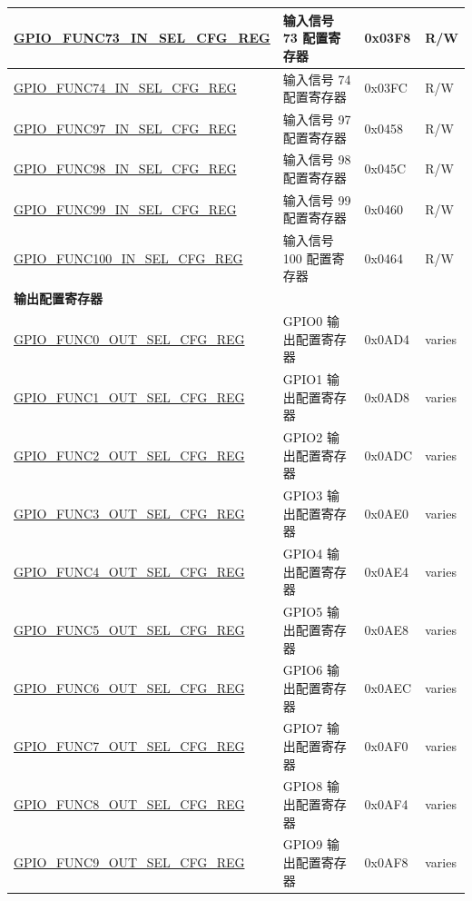\begin{longtable}{ | p{6cm} | p{7.2cm} | p{1.3cm} | p{1cm} | }
\hyperref[regdesc:GPIOFUNCTINSELCFGREG]{GPIO\_FUNC73\_IN\_SEL\_CFG\_REG} & 输入信号 73 配置寄存器 & 0x03F8 & R/W \\ \hline
\hyperref[regdesc:GPIOFUNCTINSELCFGREG]{GPIO\_FUNC74\_IN\_SEL\_CFG\_REG} & 输入信号 74 配置寄存器 & 0x03FC & R/W \\ \hline
\hyperref[regdesc:GPIOFUNCUINSELCFGREG]{GPIO\_FUNC97\_IN\_SEL\_CFG\_REG} & 输入信号 97 配置寄存器 & 0x0458 & R/W \\ \hline
\hyperref[regdesc:GPIOFUNCUINSELCFGREG]{GPIO\_FUNC98\_IN\_SEL\_CFG\_REG} & 输入信号 98 配置寄存器 & 0x045C & R/W \\ \hline
\hyperref[regdesc:GPIOFUNCUINSELCFGREG]{GPIO\_FUNC99\_IN\_SEL\_CFG\_REG} & 输入信号 99 配置寄存器 & 0x0460 & R/W \\ \hline
\hyperref[regdesc:GPIOFUNCUINSELCFGREG]{GPIO\_FUNC100\_IN\_SEL\_CFG\_REG} & 输入信号 100 配置寄存器 & 0x0464 & R/W \\ \hline
\multicolumn{4}{|l|}{\textbf{输出配置寄存器}} \\ \hline
\hyperref[regdesc:GPIOFUNCNOUTSELCFGREG]{GPIO\_FUNC0\_OUT\_SEL\_CFG\_REG} & GPIO0 输出配置寄存器 & 0x0AD4 & varies \\ \hline
\hyperref[regdesc:GPIOFUNCNOUTSELCFGREG]{GPIO\_FUNC1\_OUT\_SEL\_CFG\_REG} & GPIO1 输出配置寄存器 & 0x0AD8 & varies \\ \hline
\hyperref[regdesc:GPIOFUNCNOUTSELCFGREG]{GPIO\_FUNC2\_OUT\_SEL\_CFG\_REG} & GPIO2 输出配置寄存器 & 0x0ADC & varies \\ \hline
\hyperref[regdesc:GPIOFUNCNOUTSELCFGREG]{GPIO\_FUNC3\_OUT\_SEL\_CFG\_REG} & GPIO3 输出配置寄存器 & 0x0AE0 & varies \\ \hline
\hyperref[regdesc:GPIOFUNCNOUTSELCFGREG]{GPIO\_FUNC4\_OUT\_SEL\_CFG\_REG} & GPIO4 输出配置寄存器 & 0x0AE4 & varies \\ \hline
\hyperref[regdesc:GPIOFUNCNOUTSELCFGREG]{GPIO\_FUNC5\_OUT\_SEL\_CFG\_REG} & GPIO5 输出配置寄存器 & 0x0AE8 & varies \\ \hline
\hyperref[regdesc:GPIOFUNCNOUTSELCFGREG]{GPIO\_FUNC6\_OUT\_SEL\_CFG\_REG} & GPIO6 输出配置寄存器 & 0x0AEC & varies \\ \hline
\hyperref[regdesc:GPIOFUNCNOUTSELCFGREG]{GPIO\_FUNC7\_OUT\_SEL\_CFG\_REG} & GPIO7 输出配置寄存器 & 0x0AF0 & varies \\ \hline
\hyperref[regdesc:GPIOFUNCNOUTSELCFGREG]{GPIO\_FUNC8\_OUT\_SEL\_CFG\_REG} & GPIO8 输出配置寄存器 & 0x0AF4 & varies \\ \hline
\hyperref[regdesc:GPIOFUNCNOUTSELCFGREG]{GPIO\_FUNC9\_OUT\_SEL\_CFG\_REG} & GPIO9 输出配置寄存器 & 0x0AF8 & varies \\ \hline

\end{longtable}
